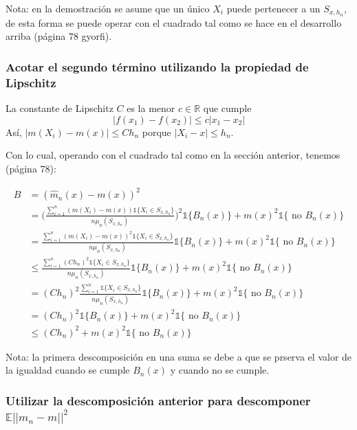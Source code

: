 \documentclass[12pt, a4paper]{article}
\begin{document}
Nota: en la demostración se asume que un único $X_i$ puede pertenecer a un $S_{x,h_n}$, de esta forma se puede operar con el cuadrado tal como se hace en el desarrollo arriba (página 78 gyorfi).

\subsubsection{Acotar el segundo término utilizando la propiedad de Lipschitz}
La constante de Lipschitz $C$ es la menor $c \in \mathds{R}$ que cumple 
$$
| f(x_1) -f(x_2) | \leq c | x_1 - x_2 |
$$
Así, $ |m(X_i)-m(x)| \leq C h_n $ porque $|X_i - x| \leq h_n$.

Con lo cual, operando con el cuadrado tal como en la sección anterior, tenemos (página 78):

$$
\begin{aligned}
  B 
  &= (\hat{m}_n(x)-m(x))^2 \\
  &=  \Bigg( \frac{ \sum_{i=1}^{n} (m(X_i) - m(x)) \mathds{1}\{ X_i \in S_{x,h_n} \} }{n \mu_n(S_{x,h_n})} \Bigg)^2 \mathds{1}\{ B_n(x) \} + m(x)^2 \mathds{1}\{ \text{ no } B_n(x) \} \\
  &=   \frac{ \sum_{i=1}^{n} (m(X_i) - m(x))^2 \mathds{1}\{ X_i \in S_{x,h_n} \} }{n \mu_n(S_{x,h_n})}  \mathds{1}\{ B_n(x) \} + m(x)^2 \mathds{1}\{ \text{ no } B_n(x) \} \\
  &\leq   \frac{ \sum_{i=1}^{n} (C h_n)^2 \mathds{1}\{ X_i \in S_{x,h_n} \} }{n \mu_n(S_{x,h_n})}  \mathds{1}\{ B_n(x) \} + m(x)^2 \mathds{1}\{ \text{ no } B_n(x) \} \\
  &= (C h_n)^2  \frac{ \sum_{i=1}^{n}  \mathds{1}\{ X_i \in S_{x,h_n} \} }{n \mu_n(S_{x,h_n})}  \mathds{1}\{ B_n(x) \} + m(x)^2 \mathds{1}\{ \text{ no } B_n(x) \} \\
  &= (C h_n)^2    \mathds{1}\{ B_n(x) \} + m(x)^2 \mathds{1}\{ \text{ no } B_n(x) \} \\
  &\leq (C h_n)^2 + m(x)^2 \mathds{1}\{ \text{ no } B_n(x) \}
\end{aligned}
$$

Nota: la primera descomposición en una suma se debe a que se prserva el valor de la igualdad cuando se cumple $B_n(x)$ y cuando no se cumple.

\subsubsection{Utilizar la descomposición anterior para descomponer $\mathds{E}|| m_n -m ||^2$}
\end{document}
